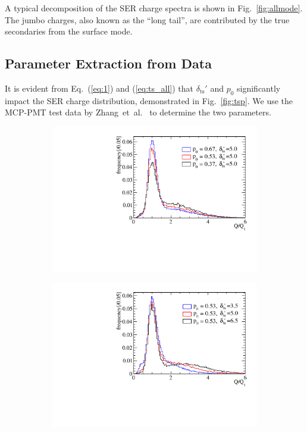 A typical decomposition of the SER charge spectra is shown in Fig.~\ref{fig:allmode}.
The jumbo charges, also known as the ``long tail'', are contributed by the true secondaries
from the surface mode.

\subsection{Parameter Extraction from Data}\label{subsec:chitest}
It is evident from Eq.~(\ref{eq:1}) and (\ref{eq:ts_all}) that $\delta_{\mathrm{ts}}'$ and \(p_0\)
significantly impact the SER charge distribution, demonstrated in Fig.~\ref{fig:tsp}.  We use
the MCP-PMT test data by Zhang~et~al.~\cite{Zhang:2023ued} to determine the two parameters.
\begin{figure}[!htbp]
	\centering
	\begin{subfigure}{0.47\textwidth}
		\centering
		\includegraphics[width=\linewidth]{PMTRelated/GTmodel/p.pdf}
		\caption{}
		\label{fig:p}
	\end{subfigure}
	\hfill
	\begin{subfigure}{0.47\textwidth}
		\centering
		\includegraphics[width=\linewidth]{PMTRelated/GTmodel/ts.pdf}

\end{subfigure}
\end{figure}
